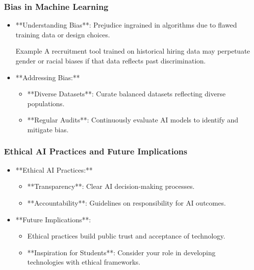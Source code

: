 \documentclass[aspectratio=169]{beamer}
\begin{document}
\begin{frame}[fragile]
    \frametitle{Bias in Machine Learning}
    \begin{itemize}
        \item **Understanding Bias**: Prejudice ingrained in algorithms due to flawed training data or design choices.
        \begin{block}{Example}
            A recruitment tool trained on historical hiring data may perpetuate gender or racial biases if that data reflects past discrimination.
        \end{block}
        \item **Addressing Bias:**
        \begin{itemize}
            \item **Diverse Datasets**: Curate balanced datasets reflecting diverse populations.
            \item **Regular Audits**: Continuously evaluate AI models to identify and mitigate bias.
        \end{itemize}
    \end{itemize}
\end{frame}

\begin{frame}[fragile]
    \frametitle{Ethical AI Practices and Future Implications}
    \begin{itemize}
        \item **Ethical AI Practices:**
        \begin{itemize}
            \item **Transparency**: Clear AI decision-making processes.
            \item **Accountability**: Guidelines on responsibility for AI outcomes.
        \end{itemize}
        \item **Future Implications**:
        \begin{itemize}
            \item Ethical practices build public trust and acceptance of technology.
            \item **Inspiration for Students**: Consider your role in developing technologies with ethical frameworks. 
        \end{itemize}
    \end{itemize}
\end{frame}
\end{document}
